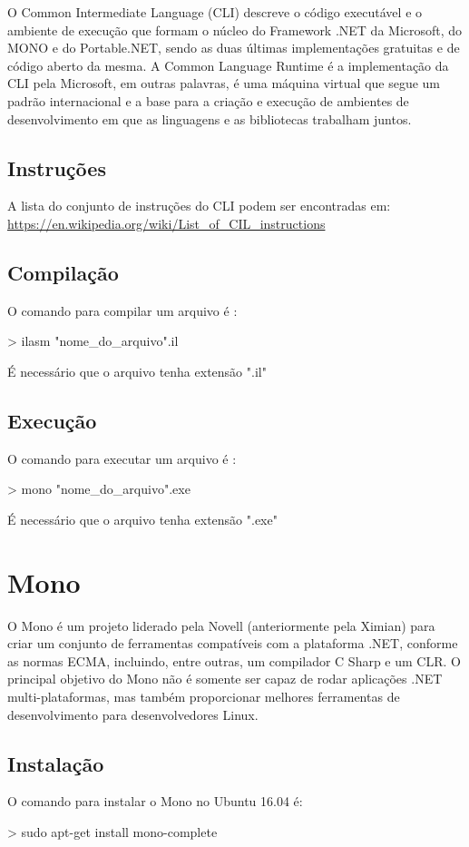 \documentclass[12pt,a4paper]{report}
\begin{document}
O Common Intermediate Language (CLI) descreve o código executável e o ambiente de execução que formam o núcleo do Framework .NET da Microsoft, do MONO e do Portable.NET, sendo as duas últimas implementações gratuitas e de código aberto da mesma. A Common Language Runtime é a implementação da CLI pela Microsoft, em outras palavras, é uma máquina virtual que segue um padrão internacional e a base para a criação e execução de ambientes de desenvolvimento em que as linguagens e as bibliotecas trabalham juntos.


\subsection{Instruções}
A lista do conjunto de instruções do CLI podem ser encontradas em: \url{https://en.wikipedia.org/wiki/List_of_CIL_instructions}

\subsection{Compilação}
O comando para compilar um arquivo é :
\begin{terminal}
> ilasm "nome_do_arquivo".il
\end{terminal}
É necessário que o arquivo tenha extensão ".il"

\subsection{Execução}
O comando para executar um arquivo é :
\begin{terminal}
> mono "nome_do_arquivo".exe
\end{terminal}
É necessário que o arquivo tenha extensão ".exe"



\section{Mono}
O Mono é um projeto liderado pela Novell (anteriormente pela Ximian) para criar um conjunto de ferramentas compatíveis com a plataforma .NET, conforme as normas ECMA, incluindo, entre outras, um compilador C Sharp e um CLR. O principal objetivo do Mono não é somente ser capaz de rodar aplicações .NET multi-plataformas, mas também proporcionar melhores ferramentas de desenvolvimento para desenvolvedores Linux.

\subsection{Instalação}
O comando para instalar o Mono no Ubuntu 16.04 é:
\begin{terminal}
> sudo apt-get install mono-complete
\end{terminal}
\end{document}
